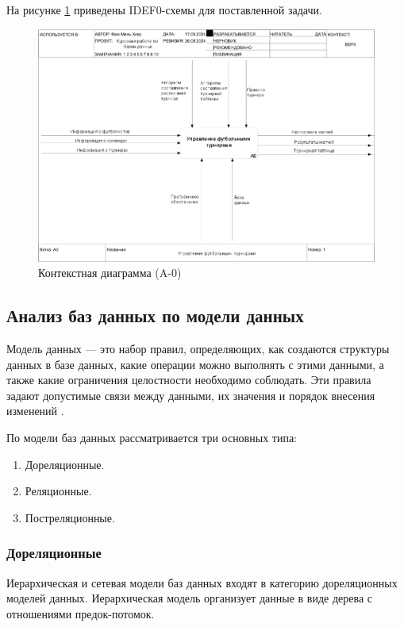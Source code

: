 На рисунке \ref{img:A0} приведены IDEF0-схемы для поставленной задачи.
\begin{figure}[h]
	\centering
	\includegraphics[height=0.45\textheight]{img/idef0/01_A0.png}
	\caption{Контекстная диаграмма (A-0)}
	\label{img:A0}
\end{figure}

\subsection{Анализ баз данных по модели данных}
Модель данных --- это набор правил, определяющих, как создаются структуры данных в базе данных, какие операции можно выполнять с этими данными, а также какие ограничения целостности необходимо соблюдать. Эти правила задают допустимые связи между данными, их значения и порядок внесения изменений \cite{roders}.

По модели баз данных рассматривается три основных типа:
\begin{enumerate}
	\item Дореляционные.
	\item Реляционные.
	\item Постреляционные.
\end{enumerate}
\subsubsection{Дореляционные}
Иерархическая и сетевая модели баз данных входят в категорию дореляционных моделей данных.
Иерархическая модель организует данные в виде дерева с отношениями предок-потомок.

